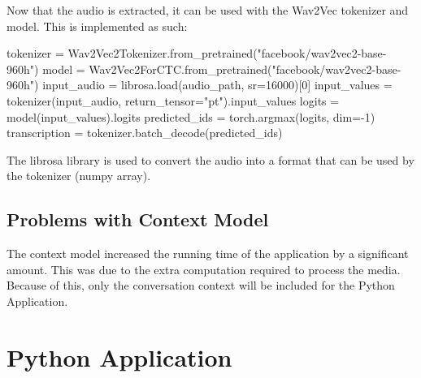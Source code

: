 Now that the audio is extracted, it can be used with the Wav2Vec tokenizer and model. This is implemented as such:
\begin{algorithm}
    \begin{algorithmic}
        \STATE tokenizer = Wav2Vec2Tokenizer.from\_pretrained("facebook/wav2vec2-base-960h")
        \STATE model = Wav2Vec2ForCTC.from\_pretrained("facebook/wav2vec2-base-960h")
        \STATE input\_audio = librosa.load(audio\_path, sr=16000)[0]
        \STATE input\_values = tokenizer(input\_audio, return\_tensor="pt").input\_values
        \STATE logits = model(input\_values).logits
        \STATE predicted\_ids = torch.argmax(logits, dim=-1)
        \STATE transcription = tokenizer.batch\_decode(predicted\_ids)
    \end{algorithmic}
\end{algorithm}

The librosa library is used to convert the audio into a format that can be used by the tokenizer (numpy array).
\subsection{Problems with Context Model}
The context model increased the running time of the application by a significant amount. This was due to the extra computation required to process the media.
Because of this, only the conversation context will be included for the Python Application.
\section{Python Application}
